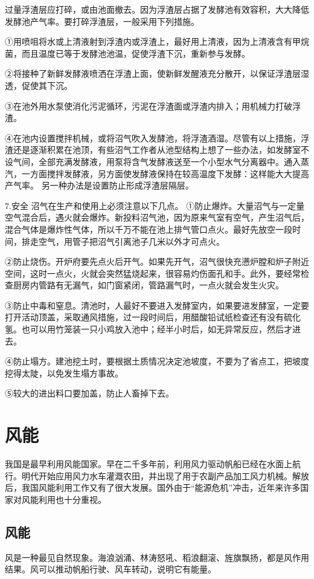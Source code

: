 \documentclass{ctexbook}
\begin{document}
过量浮渣层应打碎，或由池面撤去。因为浮渣层占据了发酵池有效容积，大大降低发酵池产气率。要打碎浮渣层，一般采用下列措施。

①用喷咀将水或上清液射到浮渣内或浮渣上，最好用上清液，因为上清液含有甲烷菌，而且温度已等于发酵池池温，促使浮渣下沉，重新参与发酵。

②将接种了新鲜发酵液喷洒在浮渣上面，使新鲜发醒液充分散开，以保证浮渣层湿透，促使其下沉。

③在池外用水泵使消化污泥循环，污泥在浮渣面或浮渣内排入；用机械力打破浮渣。

④在池内设置搅拌机械，或将沼气吹入发酵池，将浮渣酒湿。尽管有以上措施，浮渣还是逐渐积累在池顶，有些沼气工作者从池型结构上想了一些办法，如发酵室不设气间，全部充满发酵液，用泵将含气发酵液送至一个小型水气分离器中。通入蒸汽，一方面搅拌发酵液，另方面使发酵液保持在较高温度下发酵：这样能大大提高产气率。
另一种办法是设置防止形成浮渣层隔层。

7.安全
沼气在生产和使用上必须注意以下几点。
①防止爆炸。大量沼气与一定量空气混合后，遇火就会爆炸。新投料沼气池，因为原来气室有空气，产生沼气后，混合气体是爆炸性气体，所以千万不能在池上排气管口点火。最好先放空一段时间，排走空气，用管子把沼气引离池子几米以外才可点火。

②防止烧伤。开炉府要先点火后开气。如果先开气，沼气很快充懑炉膛和炉子附近空间，这时一点火，火就会突然猛烧起来，很容易灼伤面孔和手。此外，要经常检查厨房内管路有无漏气，如门窗紧闭，管路漏气时，一点火就会发生火灾。

③防止中毒和窒息。清池时，人最好不要进入发酵室内，如果要进发酵室，一定要打开活动顶盖，采取通风措施，过一段时间后，用醋酸铅试纸检查还有没有硫化氢。也可以用竹笼装一只小鸡放入池中；经半小时后，如无异常反应，然后才进去。

④防止塌方。建池挖土时，要根据土质情况决定池坡度，不要为了省点工，把坡度挖得太陡，以免发生塌方事故。

⑤较大的进出料口要加盖，防止人畜掉下去。

\section{风能}
我国是最早利用风能国家。早在二千多年前，利用风力驱动帆船已经在水面上航行。明代开始应用风力水车灌溉农田，并出现了用于农副产品加工风力机械。解放后，我国风能利用工作又有了很大发展。国外由于“能源危机”冲击，近年来许多国家对风能利用也十分重视。
\subsection{风能}
风是一种最见自然现象。海浪汹涌、林涛怒吼、稻浪翻滚、旌旗飘扬，都是风作用结果。风可以推动帆船行驶、风车转动，说明它有能量。
\end{document}
